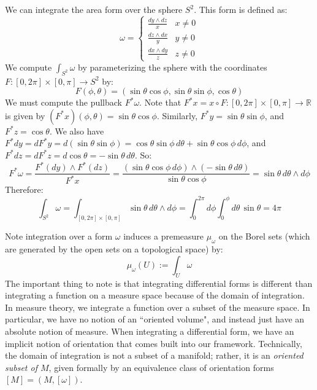 \begin{example}
	We can integrate the area form over the sphere $S^2$. This form is defined as:
	\begin{equation}
		\omega = \begin{cases}
			\frac{dy\wedge dz}{x} & x\neq 0 \\
			\frac{dz\wedge dx}{y} & y\neq 0 \\
			\frac{dx\wedge dy}{z} & z\neq 0
		\end{cases}
	\end{equation}
	We compute $\int_{S^2}\omega$ by parameterizing the sphere with the coordinates $F : [0, 2\pi]\times [0, \pi]
	\rightarrow S^2$ by:
	\begin{equation}
		F(\phi, \theta) = (\sin\theta\cos\phi, \sin\theta\sin\phi, \cos\theta)
	\end{equation}
	We must compute the pullback $F^*\omega$. Note that $F^* x = x\circ F : [0, 2\pi]\times [0, \pi]\rightarrow\mathbb 
	R$ is given by $(F^* x)(\phi, \theta) = \sin\theta\cos\phi$. Similarly, $F^* y = \sin\theta\sin\phi$, and $F^* z = \cos\theta$. 
	We also have $F^* dy = dF^*y = d(\sin\theta\sin\phi) = \cos\theta\sin\phi\,d\theta + \sin\theta\cos\phi\,d\phi$, and 
	$F^* dz = dF^* z = d\cos\theta = -\sin\theta\,d\theta$. So:
	\begin{equation}
		F^*\omega = \frac{F^*(dy)\wedge F^*(dz)}{F^*x} = \frac{(\sin\theta\cos\phi\,d\phi)\wedge (-\sin\theta\,d\theta)}{\sin
		\theta\cos\phi} = \sin\theta\,d\theta\wedge d\phi
	\end{equation}
	Therefore:
	\begin{equation}
		\int_{S^2}\omega = \int_{[0, 2\pi]\times [0, \pi]}\sin\theta\,d\theta\wedge d\phi = \int_0^{2\pi} d\phi\int_0^\phi d\theta
		\,\sin\theta = 4\pi
	\end{equation}
\end{example}

Note integration over a form $\omega$ induces a premeasure $\mu_\omega$ on the Borel sets (which are generated by 
the open sets on a topological space) by:
\begin{equation}
	\mu_\omega(U) :=\int_U\omega
\end{equation}
The important thing to note is that integrating differential forms is different than integrating a function on a measure space 
because of the domain of integration. In measure theory, we integrate a function over a subset of the measure space. 
In particular, we have no notion of an ``oriented volume", and instead just have an absolute notion of measure. When 
integrating a differential form, we have an implicit notion of orientation that comes built into our framework. Technically, 
the domain of integration is not a subset of a manifold; rather, it is an \textit{oriented subset of $M$}, given formally 
by an equivalence class of orientation forms $[M] = (M, [\omega])$. 

